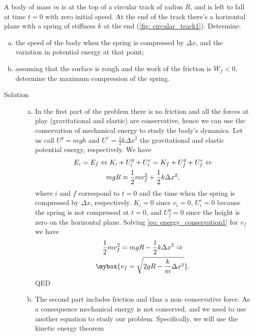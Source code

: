 A body of mass $m$ is at the top of a circular track of radius $R$, and is left to fall at time $t=0$ with zero initial speed. At the end of the track there's a horizontal plane with a spring of stiffness $k$ at the end (\cref{fig: circular_track1}).
Determine:
\begin{enumerate}[(a)]
    \item the speed of the body when the spring is compressed by $\Delta x$, and the variation in potential energy at that point;
    \item assuming that the surface is rough and the work of the friction is $W_f < 0$, determine the maximum compression of the spring.
\end{enumerate}
\begin{description}
    \item[Solution]
    \begin{enumerate}[(a)]
        \item In the first part of the problem there is no friction and all the forces at play (gravitational and elastic) are conservative, hence we can use the conservation of mechanical energy to study the body's dynamics. Let us call $U^g = mgh$ and $U^e=\frac{1}{2}k\Delta x^2$ the gravitational and elastic potential energy, respectively. We have
        \begin{gather}
            E_i = E_f \Leftrightarrow K_i + U^g_i + U^e_i = K_f + U^g_f + U^e_f \Leftrightarrow \notag \\
            mgR = \frac{1}{2}mv_f^2 + \frac{1}{2}k\Delta x^2, \label{eq: energy_conservation1}
        \end{gather}
        where $i$ and $f$ correspond to $t=0$ and the time when the spring is compressed by $\Delta x$, respectively. $K_i=0$ since $v_i=0$, $U_i^e=0$ because the spring is not compressed at $t=0$, and $U_f^g=0$ since the height is zero on the horizontal plane. Solving \cref{eq: energy_conservation1} for $v_f$ we have
        \begin{gather}
            \frac{1}{2} m v_f^2 = mgR - \frac{1}{2}k \Delta x^2 \Rightarrow \notag \\
            \mybox{v_f = \sqrt{2gR - \frac{k}{m}\Delta x^2}}.
        \end{gather}
        QED
        \item The second part includes friction and thus a non--conservative force. As a consequence mechanical energy is not conserved, and we need to use another equation to study our problem. Specifically, we will use the kinetic energy theorem

\end{enumerate}
\end{description}

